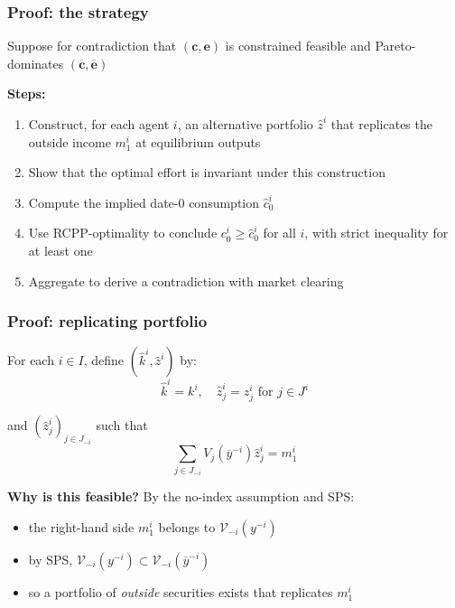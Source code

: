 \documentclass[blue]{beamer}
\def\geq{\geqslant}
\theoremstyle{definition}
\theoremstyle{example}
\begin{document}
\begin{frame}\frametitle{Proof: the strategy}
Suppose for contradiction that $(\bm{c}, \bm{e})$ is constrained feasible and Pareto-dominates $(\overline{\bm{c}}, \overline{\bm{e}})$
\bigskip

\textbf{Steps:}
\begin{enumerate}
\item Construct, for each agent $i$, an alternative portfolio $\widehat{z}^i$ that replicates the outside income $m^i_1$ at equilibrium outputs
\item Show that the optimal effort is invariant under this construction
\item Compute the implied date-$0$ consumption $\widehat{c}^i_0$
\item Use RCPP-optimality to conclude $c^i_0 \geq \widehat{c}^i_0$ for all $i$, with strict inequality for at least one
\item Aggregate to derive a contradiction with market clearing
\end{enumerate}
\end{frame}

\begin{frame}\frametitle{Proof: replicating portfolio}
For each $i \in I$, define $(\widehat{k}^i, \widehat{z}^i)$ by:
\begin{equation*}
\widehat{k}^i = k^i, \quad \widehat{z}^i_j = z^i_j \text{ for $j \in J^i$}
\end{equation*}
\bigskip

and $(\widehat{z}^i_j)_{j \in J_{-i}}$ such that
\begin{equation*}
\sum_{j \in J_{-i}} V_j(\overline{y}^{-i}) \widehat{z}^i_j = m^i_1
\end{equation*}
\bigskip

\textbf{Why is this feasible?} By the no-index assumption and SPS:
\begin{itemize}
\item the right-hand side $m^i_1$ belongs to $\mathcal{V}_{-i}(y^{-i})$
\item by SPS, $\mathcal{V}_{-i}(y^{-i}) \subset \mathcal{V}_{-i}(\overline{y}^{-i})$
\item so a portfolio of \emph{outside} securities exists that replicates $m^i_1$
\end{itemize}
\end{frame}
\end{document}
